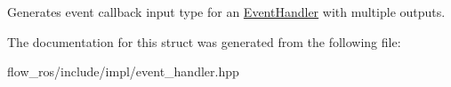 Generates event callback input type for an \hyperlink{classflow__ros_1_1_event_handler}{Event\+Handler} with multiple outputs. 

The documentation for this struct was generated from the following file\+:\begin{DoxyCompactItemize}
\item 
flow\+\_\+ros/include/impl/event\+\_\+handler.\+hpp\end{DoxyCompactItemize}
